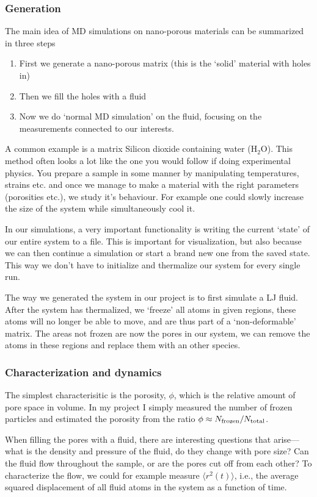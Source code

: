 \documentclass[a4paper, 11pt, notitlepage, english]{article}
\begin{document}
\subsubsection*{Generation}
The main idea of MD simulations on nano-porous materials can be summarized in three steps
\begin{enumerate}
	\item First we generate a nano-porous matrix (this is the `solid' material with holes in)
	\item Then we fill the holes with a fluid
	\item Now we do `normal MD simulation' on the fluid, focusing on the measurements connected to our interests. 
\end{enumerate}
A common example is a matrix Silicon dioxide containing water (H$_2$O). This method often looks a lot like the one you would follow if doing experimental physics. You prepare a sample in some manner by manipulating temperatures, strains etc. and once we manage to make a material with the right parameters (porosities etc.), we study it's behaviour. For example one could slowly increase the size of the system while simultaneously cool it.

In our simulations, a very important functionality is writing the current `state' of our entire system to a file. This is important for visualization, but also because we can then continue a simulation or start a brand new one from the saved state. This way we don't have to initialize and thermalize our system for every single run. 

The way we generated the system in our project is to first simulate a LJ fluid. After the system has thermalized, we `freeze' all atoms in given regions, these atoms will no longer be able to move, and are thus part of a `non-deformable' matrix. The areas not frozen are now the pores in our system, we can remove the atoms in these regions and replace them with an other species.

\subsubsection*{Characterization and dynamics}

The simplest characterisitic is the porosity, $\phi$, which is the relative amount of pore space in volume. In my project I simply measured the number of frozen particles and estimated the porosity from the ratio $\phi \approx N_{\rm frozen}/N_{\rm total}$.

When filling the pores with a fluid, there are interesting questions that arise---what is the density and pressure of the fluid, do they change with pore size? Can the fluid flow throughout the sample, or are the pores cut off from each other? To characterize the flow, we could for example measure $\langle r^2(t) \rangle$, i.e., the average squared displacement of all fluid atoms in the system as a function of time.
\end{document}
